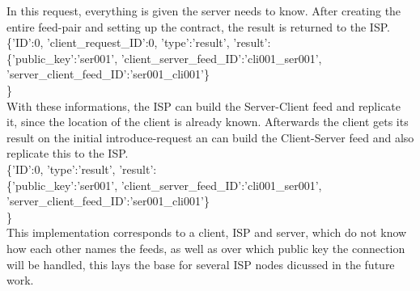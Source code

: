 In this request, everything is given the server needs to know. After creating the entire feed-pair and setting up the contract, the result is returned to the ISP.
\\
\{'ID':0, 'client\_request\_ID':0, 'type':'result', 'result':\\\{'public\_key':'ser001', 'client\_server\_feed\_ID':'cli001\_ser001', 'server\_client\_feed\_ID':'ser001\_cli001'\}\\\}\\
With these informations, the ISP can build the Server-Client feed and replicate it, since the location of the client is already known.
Afterwards the client gets its result on the initial introduce-request an can build the Client-Server feed and also replicate this to the ISP.\\
\{'ID':0, 'type':'result', 'result':\\\{'public\_key':'ser001', 'client\_server\_feed\_ID':'cli001\_ser001', 'server\_client\_feed\_ID':'ser001\_cli001'\}\\\}\\
This implementation corresponds to a client, ISP and server, which do not know how each other names the feeds, as well as over which public key the connection will be handled, this lays the base for several ISP nodes dicussed in the future work. 

